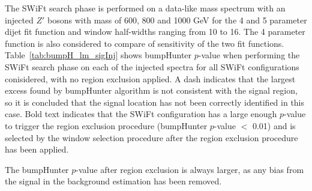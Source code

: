 The  SWiFt search phase is performed on a data-like mass spectrum
with an injected $Z'$ bosons with mass of 600, 800 and 1000 GeV
for the 4 and 5 parameter dijet fit function and window half-widths ranging from 10 to 16.
The 4 parameter function is also considered to compare of sensitivity of the two fit functions.
Table~\ref{tab:bumpH_lm_sigInj} shows bumpHunter \mbox{$p$-value} 
when performing the SWiFt search phase on each of the injected spectra
for all SWiFt configurations conisidered, with no region exclusion applied.
A dash indicates that the largest excess found by bumpHunter algorithm is not consistent with the
signal region, so it is concluded that the signal location has not been correctly identified in this case.
Bold text indicates that the SWiFt configuration has a large enough $p$-value
to trigger the region exclusion procedure (bumpHunter $p$-value $<$ 0.01)
and is selected by the window selection procedure after the region exclusion procedure has been applied.

The bumpHunter \mbox{$p$-value} after region exclusion is always larger, as any bias from the signal in the background estimation has been removed.


